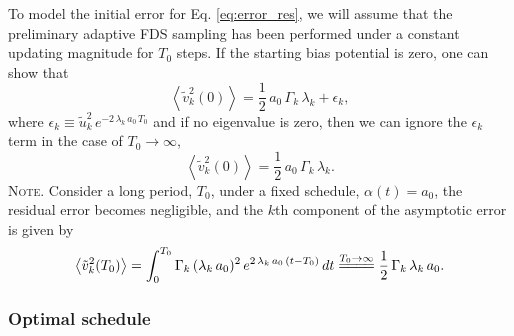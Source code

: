 \documentclass[reprint, superscriptaddress, floatfix]{revtex4-1}
\newcommand{\note}[1]{{\color{DarkGreen}\footnotesize \textsc{Note.} #1}}
\begin{document}



To model the initial error for Eq. \eqref{eq:error_res},
we will assume that
the preliminary adaptive FDS sampling has been
performed under a constant updating magnitude for $T_0$ steps.
%
If the starting bias potential is zero,
one can show that
\begin{equation}
  \left\langle
    {\tilde v}_k^2(0)
  \right\rangle
  = \frac 1 2 \, a_0 \, \Gamma_k \, \lambda_k
  + \epsilon_k
  ,
  \label{eq:xt2_eql1}
\end{equation}
%
where
$\epsilon_k \equiv \tilde u_k^2 \, e^{-2\, \lambda_k \, a_0 \, T_0}$
and if no eigenvalue is zero,
then we can ignore the $\epsilon_k$ term
in the case of $T_0 \to \infty$,
%
\begin{equation}
  \left\langle
    {\tilde v}_k^2(0)
  \right\rangle
  = \frac 1 2 \, a_0 \, \Gamma_k \, \lambda_k
  .
  \label{eq:xt2_eql}
\end{equation}
%
\note{
Consider a long period, $T_0$, under a fixed schedule,
$\alpha(t) = a_0$,
the residual error becomes negligible, and
the $k$th component of the asymptotic error
is given by
%
\begin{align*}
  \left\langle
    {\tilde v}_k^2(T_0)
  \right\rangle
  =
  \int_0^{T_0}
    \Gamma_k \, (\lambda_k \, a_0)^2 \,
      e^{ 2 \, \lambda_k \, a_0 \, (t - T_0) }
    \, dt
  \stackrel{ T_0 \to \infty }
  { =\joinrel=\joinrel=\joinrel= }
  \frac 1 2 \, \Gamma_k \, \lambda_k \, a_0
  .
\notag
\end{align*}
}
%



\subsubsection{\label{sec:optschedule}
Optimal schedule}
\end{document}
